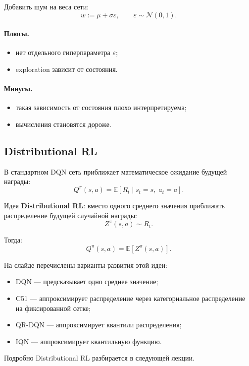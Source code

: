 \documentclass[12pt,a4paper]{article}
\begin{document}
Добавить шум на веса сети:
\[
w
:=
\mu+\sigma\varepsilon,
\qquad
\varepsilon \sim \mathcal N(0,1).
\]

\paragraph{Плюсы.}

\begin{itemize}
    \item нет отдельного гиперпараметра $\varepsilon$;
    \item exploration зависит от состояния.
\end{itemize}

\paragraph{Минусы.}

\begin{itemize}
    \item такая зависимость от состояния плохо интерпретируема;
    \item вычисления становятся дороже.
\end{itemize}

\subsection{Distributional RL}

В стандартном DQN сеть приближает математическое ожидание будущей награды:
\[
Q^\pi(s,a)
=
\mathbb E
\left[
R_t
\mid
s_t=s,\;a_t=a
\right].
\]

Идея \textbf{Distributional RL}: вместо одного среднего значения приближать распределение будущей случайной награды:
\[
Z^\pi(s,a)
\sim
R_t.
\]

Тогда:
\[
Q^\pi(s,a)
=
\mathbb E
\left[
Z^\pi(s,a)
\right].
\]

На слайде перечислены варианты развития этой идеи:
\begin{itemize}
    \item DQN --- предсказывает одно среднее значение;
    \item C51 --- аппроксимирует распределение через категориальное распределение на фиксированной сетке;
    \item QR-DQN --- аппроксимирует квантили распределения;
    \item IQN --- аппроксимирует квантильную функцию.
\end{itemize}

Подробно Distributional RL разбирается в следующей лекции.
\end{document}
